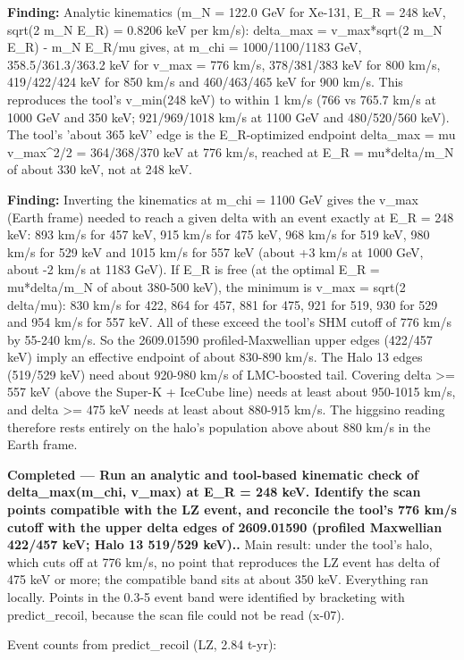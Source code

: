 \documentclass[11pt,a4paper]{article}
\begin{document}
\textbf{Finding:} Analytic kinematics (m\_N = 122.0 GeV for Xe-131, E\_R = 248 keV, sqrt(2 m\_N E\_R) = 0.8206 keV per km/s): delta\_max = v\_max*sqrt(2 m\_N E\_R) - m\_N E\_R/mu gives, at m\_chi = 1000/1100/1183 GeV, 358.5/361.3/363.2 keV for v\_max = 776 km/s, 378/381/383 keV for 800 km/s, 419/422/424 keV for 850 km/s and 460/463/465 keV for 900 km/s. This reproduces the tool's v\_min(248 keV) to within 1 km/s (766 vs 765.7 km/s at 1000 GeV and 350 keV; 921/969/1018 km/s at 1100 GeV and 480/520/560 keV). The tool's 'about 365 keV' edge is the E\_R-optimized endpoint delta\_max = mu v\_max\textasciicircum{}2/2 = 364/368/370 keV at 776 km/s, reached at E\_R = mu*delta/m\_N of about 330 keV, not at 248 keV.

\textbf{Finding:} Inverting the kinematics at m\_chi = 1100 GeV gives the v\_max (Earth frame) needed to reach a given delta with an event exactly at E\_R = 248 keV: 893 km/s for 457 keV, 915 km/s for 475 keV, 968 km/s for 519 keV, 980 km/s for 529 keV and 1015 km/s for 557 keV (about +3 km/s at 1000 GeV, about -2 km/s at 1183 GeV). If E\_R is free (at the optimal E\_R = mu*delta/m\_N of about 380-500 keV), the minimum is v\_max = sqrt(2 delta/mu): 830 km/s for 422, 864 for 457, 881 for 475, 921 for 519, 930 for 529 and 954 km/s for 557 keV. All of these exceed the tool's SHM cutoff of 776 km/s by 55-240 km/s. So the 2609.01590 profiled-Maxwellian upper edges (422/457 keV) imply an effective endpoint of about 830-890 km/s. The Halo 13 edges (519/529 keV) need about 920-980 km/s of LMC-boosted tail. Covering delta \textgreater{}= 557 keV (above the Super-K + IceCube line) needs at least about 950-1015 km/s, and delta \textgreater{}= 475 keV needs at least about 880-915 km/s. The higgsino reading therefore rests entirely on the halo's population above about 880 km/s in the Earth frame.

\textbf{Completed --- Run an analytic and tool-based kinematic check of delta\_max(m\_chi, v\_max) at E\_R = 248 keV. Identify the scan points compatible with the LZ event, and reconcile the tool's 776 km/s cutoff with the upper delta edges of 2609.01590 (profiled Maxwellian 422/457 keV; Halo 13 519/529 keV)..} Main result: under the tool's halo, which cuts off at 776 km/s, no point that reproduces the LZ event has delta of 475 keV or more; the compatible band sits at about 350 keV. Everything ran locally. Points in the 0.3-5 event band were identified by bracketing with predict\_recoil, because the scan file could not be read (x-07).

Event counts from predict\_recoil (LZ, 2.84 t-yr):
\end{document}
